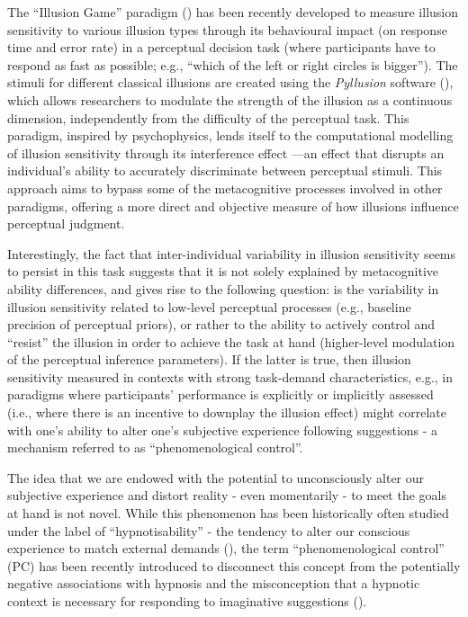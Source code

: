 \documentclass[
  man,
  floatsintext,
  longtable,
  nolmodern,
  notxfonts,
  notimes,
  colorlinks=true,linkcolor=blue,citecolor=blue,urlcolor=blue]{apa7}
\begin{document}
The ``Illusion Game'' paradigm () has been recently developed to measure illusion sensitivity
to various illusion types through its behavioural impact (on response
time and error rate) in a perceptual decision task (where participants
have to respond as fast as possible; e.g., ``which of the left or right
circles is bigger''). The stimuli for different classical illusions are
created using the \emph{Pyllusion} software
(), which allows
researchers to modulate the strength of the illusion as a continuous
dimension, independently from the difficulty of the perceptual task.
This paradigm, inspired by psychophysics, lends itself to the
computational modelling of illusion sensitivity through its interference
effect ---an effect that disrupts an individual's ability to accurately
discriminate between perceptual stimuli. This approach aims to bypass
some of the metacognitive processes involved in other paradigms,
offering a more direct and objective measure of how illusions influence
perceptual judgment.

Interestingly, the fact that inter-individual variability in illusion
sensitivity seems to persist in this task suggests that it is not solely
explained by metacognitive ability differences, and gives rise to the
following question: is the variability in illusion sensitivity related
to low-level perceptual processes (e.g., baseline precision of
perceptual priors), or rather to the ability to actively control and
``resist'' the illusion in order to achieve the task at hand
(higher-level modulation of the perceptual inference parameters). If the
latter is true, then illusion sensitivity measured in contexts with
strong task-demand characteristics, e.g., in paradigms where
participants' performance is explicitly or implicitly assessed (i.e.,
where there is an incentive to downplay the illusion effect) might
correlate with one's ability to alter one's subjective experience
following suggestions - a mechanism referred to as ``phenomenological
control''.

The idea that we are endowed with the potential to unconsciously alter
our subjective experience and distort reality - even momentarily - to
meet the goals at hand is not novel. While this phenomenon has been
historically often studied under the label of ``hypnotisability'' - the
tendency to alter our conscious experience to match external demands
(), the term
``phenomenological control'' (PC) has been recently introduced to
disconnect this concept from the potentially negative associations with
hypnosis and the misconception that a hypnotic context is necessary for
responding to imaginative suggestions ().
\end{document}
